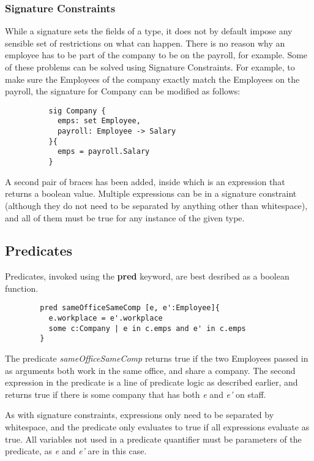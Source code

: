 \documentclass[10pt]{article}
\begin{document}
      \subsubsection*{Signature Constraints}
        While a signature sets the fields of a type, it does not by default impose any sensible set of restrictions on what can happen. There is no reason why an employee has to be part of the company to be on the payroll, for example. Some of these problems can be solved using Signature Constraints. For example, to make sure the Employees of the company exactly match the Employees on the payroll, the signature for Company can be modified as follows:
        \begin{lstlisting}
          sig Company {
            emps: set Employee,
            payroll: Employee -> Salary
          }{
            emps = payroll.Salary
          }
        \end{lstlisting}\par
        A second pair of braces has been added, inside which is an expression that returns a boolean value. Multiple expressions can be in a signature constraint (although they do not need to be separated by anything other than whitespace), and all of them must be true for any instance of the given type.
    \subsection*{Predicates}
      Predicates, invoked using the \textbf{pred} keyword, are best desribed as a boolean function.
      \begin{lstlisting}
        pred sameOfficeSameComp [e, e':Employee]{
          e.workplace = e'.workplace
          some c:Company | e in c.emps and e' in c.emps
        }
      \end{lstlisting}\par
      The predicate \textit{sameOfficeSameComp} returns true if the two Employees passed in as arguments both work in the same office, and share a company. The second expression in the predicate is a line of predicate logic as described earlier, and returns true if there is some company that has both \textit{e} and \textit{e'} on staff.\par
      As with signature constraints, expressions only need to be separated by whitespace, and the predicate only evaluates to true if all expressions evaluate as true. All variables not used in a predicate quantifier must be parameters of the predicate, as \textit{e} and \textit{e'} are in this case.
\end{document}
